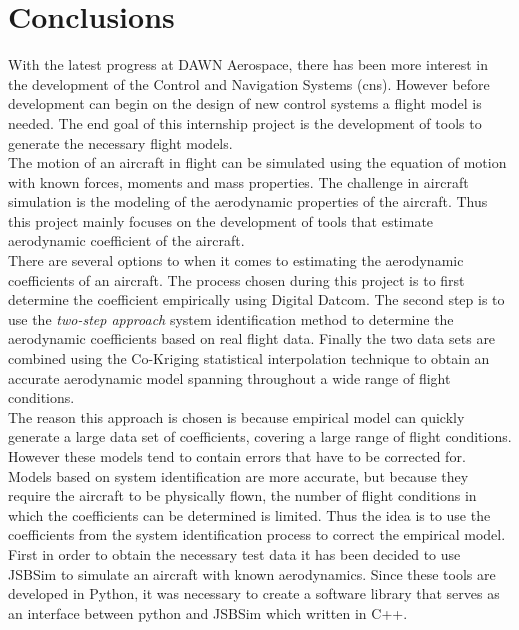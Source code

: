 \chapter{Conclusions}
With the latest progress at DAWN Aerospace, there has been more interest in the development of the Control and Navigation Systems (\gls{cns}). However before development can begin on the design of new control systems a flight model is needed. The end goal of this internship project is the development of tools to generate the necessary flight models.\\

The motion of an aircraft in flight can be simulated using the equation of motion with known forces, moments and mass properties. The challenge in aircraft simulation is the modeling of the aerodynamic properties of the aircraft. Thus this project mainly focuses on the development of tools that estimate aerodynamic coefficient of the aircraft.\\

There are several options to when it comes to estimating the aerodynamic coefficients of an aircraft. The process chosen during this project is to first determine the coefficient empirically using Digital Datcom. The second step is to use the \textit{two-step approach} system identification method to determine the aerodynamic coefficients based on real flight data. Finally the two data sets are combined using the Co-Kriging statistical interpolation technique to obtain an accurate aerodynamic model spanning throughout a wide range of flight conditions.\\

The reason this approach is chosen is because empirical model can quickly generate a large data set of coefficients, covering a large range of flight conditions. However these models tend to contain errors that have to be corrected for. Models based on system identification are more accurate, but because they require the aircraft to be physically flown, the number of flight conditions in which the coefficients can be determined is limited. Thus the idea is to use the coefficients from the system identification process to correct the empirical model.\\

First in order to obtain the necessary test data it has been decided to use JSBSim to simulate an aircraft with known aerodynamics. Since these tools are developed in Python, it was necessary to create a software library that serves as an interface between python and JSBSim which written in C++. \\

